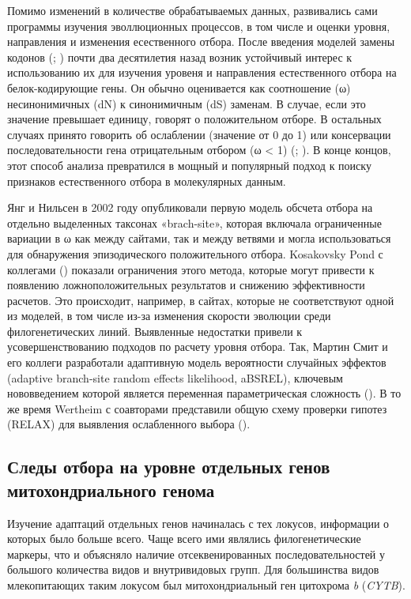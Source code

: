 Помимо изменений в количестве обрабатываемых данных, развивались сами программы изучения эволлюционных процессов, в том числе и оценки уровня, направления и изменения есественного отбора. После введения моделей замены кодонов (\cite{Goldman1994}; \cite{Muse1994}) почти два десятилетия назад возник устойчивый интерес к использованию их для изучения уровеня и направления естественного отбора на белок-кодирующие гены. Он обычно оценивается как соотношение (ω) несинонимичных (dN) к синонимичным (dS) заменам. В случае, если это значение превышает единицу, говорят о положительном отборе. В остальных случаях принято говорить об ослаблении (значение от 0 до 1) или консервации последовательности гена отрицательным отбором (ω < 1) (\cite{Anisimova2009}; \cite{Delport2008}). В конце концов, этот способ анализа  превратился в мощный и популярный подход к поиску признаков естественного отбора в молекулярных данным. 

Янг и Нильсен в 2002 году опубликовали первую модель обсчета отбора на отдельно выделенных таксонах «brach-site», которая включала ограниченные вариации в ω как между сайтами, так и между ветвями и могла использоваться для обнаружения эпизодического положительного отбора. Kosakovsky Pond с коллегами (\cite{KosakovskyPond2011}) показали ограничения этого метода, которые могут привести к появлению ложноположительных результатов и снижению эффективности расчетов. Это происходит, например, в сайтах, которые не соответствуют одной из моделей, в том числе из-за изменения скорости эволюции среди филогенетических линий. Выявленные недостатки привели к усовершенствованию подходов по расчету уровня отбора. Так, Мартин Смит и его коллеги разработали адаптивную модель вероятности случайных эффектов (adaptive branch-site random effects likelihood, aBSREL), ключевым нововведением которой является переменная параметрическая сложность (\cite{Smith2015}). В то же время Wertheim с соавторами представили общую схему проверки гипотез (RELAX) для выявления ослабленного выбора (\cite{Wertheim2015}). 

\subsection{Следы отбора на уровне отдельных генов митохондриального генома}

Изучение адаптаций отдельных генов начиналась с тех локусов, информации о которых было больше всего. Чаще всего ими являлись филогенетические маркеры, что и объясняло наличие отсеквенированных последовательностей у большого количества видов и внутривидовых групп.  Для большинства видов млекопитающих таким локусом был митохондриальный ген цитохрома \textit{b} (\textit{CYTB}).


